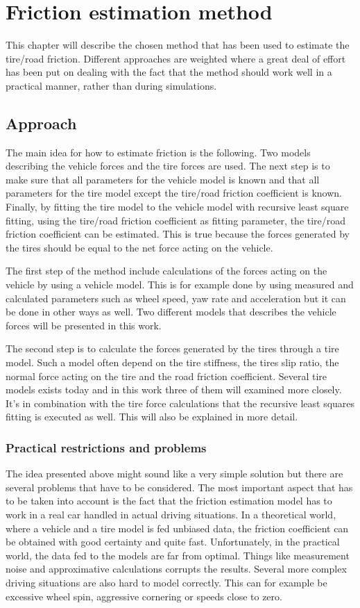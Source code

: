 \chapter{Friction estimation method}

This chapter will describe the chosen method that has been used to estimate the tire/road friction. Different approaches are weighted where a great deal of effort has been put on dealing with the fact that the method should work well in a practical manner, rather than during simulations.

\section{Approach}
The main idea for how to estimate friction is the following. Two models describing the vehicle forces and the tire forces are used. The next step is to make sure that all parameters for the vehicle model is known and that all parameters for the tire model except the tire/road friction coefficient is known. Finally, by fitting the tire model to the vehicle model with recursive least square fitting, using the tire/road friction coefficient as fitting parameter, the tire/road friction coefficient can be estimated. This is true because the forces generated by the tires should be equal to the net force acting on the vehicle.

The first step of the method include calculations of the forces acting on the vehicle by using a vehicle model. This is for example done by using measured and calculated parameters such as wheel speed, yaw rate and acceleration but it can be done in other ways as well. Two different models that describes the vehicle forces will be presented in this work. 

The second step is to calculate the forces generated by the tires through a tire model. Such a model often depend on the tire stiffness, the tires slip ratio, the normal force acting on the tire and the road friction coefficient. Several tire models exists today and in this work three of them will examined more closely. It's in combination with the tire force calculations that the recursive least squares fitting is executed as well. This will also be explained in more detail. 

\subsection{Practical restrictions and problems}
The idea presented above might sound like a very simple solution but there are several problems that have to be considered. The most important aspect that has to be taken into account is the fact that the friction estimation model has to work in a real car handled in actual driving situations. In a theoretical world, where a vehicle and a tire model is fed unbiased data, the friction coefficient can be obtained with good certainty and quite fast. Unfortunately, in the practical world, the data fed to the models are far from optimal. Things like measurement noise and approximative calculations corrupts the results. Several more complex driving situations are also hard to model correctly. This can for example be excessive wheel spin, aggressive cornering or speeds close to zero.

